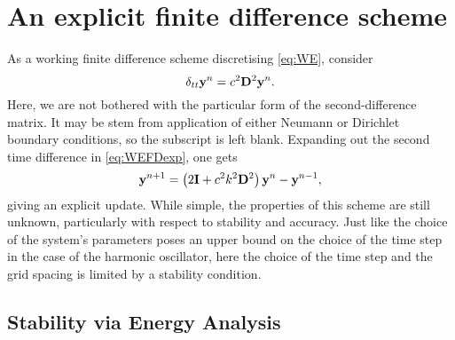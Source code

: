 \section{An explicit finite difference scheme}

As a working finite difference scheme discretising \eqref{eq:WE}, consider
\begin{equation}\label{eq:WEFDexp}
\delta_{tt} {\bf y}^n = c^2 {\bf D}^2 {\bf y}^n.
\end{equation}
Here, we are not bothered with the particular form of the second-difference matrix. It may be stem from application of either Neumann or Dirichlet boundary conditions, so the subscript is left blank. 
Expanding out the second time difference in \eqref{eq:WEFDexp}, one gets
\begin{equation}
{\bf y}^{n+1} = \left(2{\bf I}+c^2k^2{\bf D}^2 \right){\bf y}^n - {\bf y}^{n-1},
\end{equation}
giving an explicit update. While simple, the properties of this scheme are still unknown, particularly with respect to stability and accuracy. Just like the choice of the system's parameters poses an upper bound on the choice of the time step in the case of the harmonic oscillator, here the choice of the time step and the grid spacing is limited by a stability condition. 


\subsection{Stability via Energy Analysis}
 
